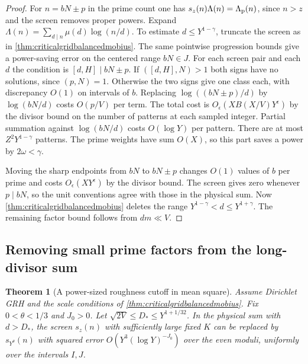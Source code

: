 \documentclass[11pt,a4paper]{article}
\numberwithin{equation}{section}
\newtheorem{theorem}{Theorem}[section]
\begin{document}
\begin{proof}
For $n=bN\pm p$ in the prime count one has
$s_z(n)\Lambda(n)=\Lambda_{\rm p}(n)$, since
$n>z$ and the screen removes proper powers.
Expand $\Lambda(n)=\sum_{d\mid n}\mu(d)\log(n/d)$.
To estimate $d\le Y^{1-\gamma}$, truncate the
screen as in \cref{thm:criticalgridbalancedmobius}.
The same pointwise progression bounds give a
power-saving error on the centered range $bN\in J$.
For each screen pair and each $d$ the condition is
$[d,H]\mid bN\pm p$. If $([d,H],N)>1$ both
signs have no solutions, since $(p,N)=1$.
Otherwise the two signs give one class each,
with discrepancy $O(1)$ on intervals of $b$.
Replacing $\log((bN\pm p)/d)$ by $\log(bN/d)$
costs $O(p/V)$ per term. The total cost is
$O_\epsilon(XB(X/V)Y^\epsilon)$ by the
divisor bound on the number of patterns at each
sampled integer. Partial summation against
$\log(bN/d)$ costs $O(\log Y)$ per pattern.
There are at most $Z^2 Y^{1-\gamma}$ patterns.
The prime weights have sum $O(X)$, so this
part saves a power by $2\omega<\gamma$.

Moving the sharp endpoints from $bN$ to $bN\pm p$
changes $O(1)$ values of $b$ per prime and costs
$O_\epsilon(XY^\epsilon)$ by the divisor bound.
The screen gives zero whenever $p\mid bN$, so
the unit conventions agree with those in the
physical sum. Now \cref{thm:criticalgridbalancedmobius}
deletes the range $Y^{1-\gamma}<d\le Y^{1+\gamma}$.
The remaining factor bound follows from $dm\ll V$.
\end{proof}

\clearpage
\subsection{Removing small prime factors from the long-divisor sum}

\begin{theorem}[A power-sized roughness cutoff in mean square]
\label{thm:criticalgridrough-tail}
Assume Dirichlet GRH and the scale conditions of
\cref{thm:criticalgridbalancedmobius}. Fix $0<\theta<1/3$
and $J_0>0$. Let $\sqrt{2V}\le D_*\le Y^{1+1/32}$.
In the physical sum with $d>D_*$, the screen
$s_z(n)$ with sufficiently large fixed $K$ can be replaced
by $s_{Y^\theta}(n)$ with squared error
$O(Y^3(\log Y)^{-J_0})$ over the even moduli, uniformly
over the intervals $I,J$.
\end{theorem}
\end{document}
